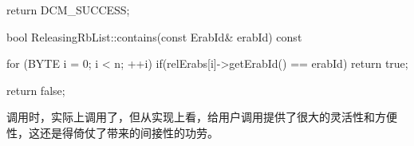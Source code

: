 \begin{content}
\begin{leftbar}
\begin{c++}
{    return DCM_SUCCESS;
}

bool ReleasingRbList::contains(const ErabId& erabId) const
{
    for (BYTE i = 0; i < n; ++i)
    {
        if(relErabs[i]->getErabId() == erabId)
        {
            return true;
        }
    }

    return false;
}
\end{c++}
\end{leftbar}

调用时，实际上调用了，但从实现上看，给用户调用提供了很大的灵活性和方便性，这还是得倚仗了带来的间接性的功劳。

\end{content}
